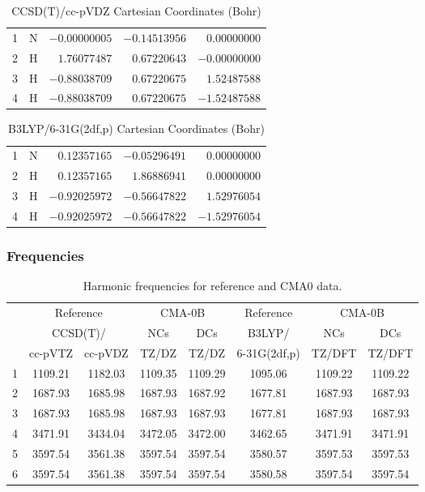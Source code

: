\documentclass[10pt,oneside]{article}
\begin{document}
\begin{table}[h!]
\centering
\caption{CCSD(T)/cc-pVDZ Cartesian Coordinates (Bohr)}
\begin{tabular}{llrrr}
1  & N  & $-0.00000005$ & $-0.14513956$ & $ 0.00000000$ \\
2  & H  & $ 1.76077487$ & $ 0.67220643$ & $-0.00000000$ \\
3  & H  & $-0.88038709$ & $ 0.67220675$ & $ 1.52487588$ \\
4  & H  & $-0.88038709$ & $ 0.67220675$ & $-1.52487588$ \\
\end{tabular}
\end{table}

\begin{table}[h!]
\centering
\caption{B3LYP/6-31G(2df,p) Cartesian Coordinates (Bohr)}
\begin{tabular}{llrrr}
1  & N  & $ 0.12357165$ & $-0.05296491$ & $ 0.00000000$ \\
2  & H  & $ 0.12357165$ & $ 1.86886941$ & $ 0.00000000$ \\
3  & H  & $-0.92025972$ & $-0.56647822$ & $ 1.52976054$ \\
4  & H  & $-0.92025972$ & $-0.56647822$ & $-1.52976054$ \\
\end{tabular}
\end{table}

\clearpage

\subsubsection*{Frequencies}
\begin{table}[h!]
\centering
\caption{Harmonic frequencies for reference and CMA0 data.}
\begin{tabular}{cccccccc}
\toprule
{} & \multicolumn{2}{c}{Reference} & \multicolumn{2}{c}{CMA-0B} &    Reference & \multicolumn{2}{c}{CMA-0B} \\
{} & \multicolumn{2}{c}{CCSD(T)/} &     NCs &     DCs &       B3LYP/ &     NCs &     DCs \\
{} &   cc-pVTZ & cc-pVDZ &   TZ/DZ &   TZ/DZ & 6-31G(2df,p) &  TZ/DFT &  TZ/DFT \\
\midrule
1 &   1109.21 & 1182.03 & 1109.35 & 1109.29 &      1095.06 & 1109.22 & 1109.22 \\
2 &   1687.93 & 1685.98 & 1687.93 & 1687.92 &      1677.81 & 1687.93 & 1687.93 \\
3 &   1687.93 & 1685.98 & 1687.93 & 1687.93 &      1677.81 & 1687.93 & 1687.93 \\
4 &   3471.91 & 3434.04 & 3472.05 & 3472.00 &      3462.65 & 3471.91 & 3471.91 \\
5 &   3597.54 & 3561.38 & 3597.54 & 3597.54 &      3580.57 & 3597.53 & 3597.53 \\
6 &   3597.54 & 3561.38 & 3597.54 & 3597.54 &      3580.58 & 3597.54 & 3597.54 \\
\bottomrule
\end{tabular}
\end{table}
\end{document}
